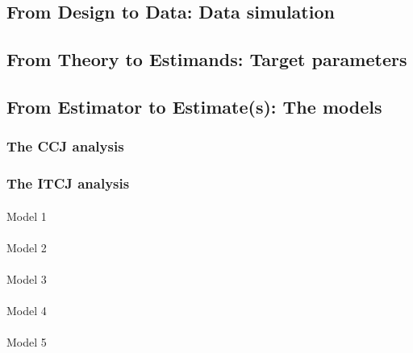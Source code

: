 \documentclass[
  authoryear,
  review,
  1p]{elsarticle}
\makeatletter
\let\oldparagraph\paragraph
\renewcommand{\paragraph}{
    \@ifstar
      \xxxParagraphStar
      \xxxParagraphNoStar
  }
\newcommand{\xxxParagraphStar}[1]{\oldparagraph*{#1}\mbox{}}
\newcommand{\xxxParagraphNoStar}[1]{\oldparagraph{#1}\mbox{}}
\makeatother
\begin{document}
\subsection{From Design to Data: Data
simulation}\label{sec-methods_step2}

\subsection{From Theory to Estimands: Target
parameters}\label{sec-methods_step3}

\subsection{From Estimator to Estimate(s): The
models}\label{sec-methods_step5}

\subsubsection{The CCJ analysis}\label{sec-methods_step5_1}

\subsubsection{The ITCJ analysis}\label{sec-methods_step5_2}

\paragraph{Model 1}\label{sec-sec-methods_step5_2_itcj_1}

\paragraph{Model 2}\label{sec-sec-methods_step5_2_itcj_2}

\paragraph{Model 3}\label{sec-sec-methods_step5_2_itcj_3}

\paragraph{Model 4}\label{sec-sec-methods_step5_2_itcj_4}

\paragraph{Model 5}\label{sec-sec-methods_step5_2_itcj_5}
\end{document}
